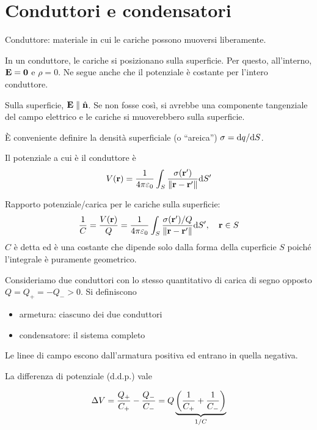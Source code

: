 
\section{Conduttori e condensatori}

Conduttore: materiale in cui le cariche possono muoversi liberamente.

In un conduttore, le cariche si posizionano sulla superficie.
Per questo, all'interno, $\mathbf{E} = \mathbf{0}$ e $\rho = 0$.
Ne segue anche che il potenziale è costante per l'intero conduttore.

Sulla superficie, $\mathbf{E} \parallel \hat{\mathbf{n}}$.
Se non fosse così, si avrebbe una componente tangenziale del campo elettrico e le cariche si muoverebbero sulla superficie.

È conveniente definire la densità superficiale (o ``areica'') $\sigma = \mathrm{d} q / \mathrm{d} S$.

Il potenziale a cui è il conduttore è
\begin{equation}
    V(\mathbf{r}) = \frac{1}{4\pi \varepsilon_0} \int_S \frac{\sigma(\mathbf{r}')}{\left\lVert \mathbf{r} - \mathbf{r}' \right\rVert} \mathrm{d} S'
\end{equation}

Rapporto potenziale/carica per le cariche sulla superficie:
\begin{equation}
    \frac{1}{C} = \frac{V(\mathbf{r})}{Q} = \frac{1}{4\pi \varepsilon_0} \int_S \frac{\sigma(\mathbf{r}')/Q}{\left\lVert \mathbf{r} - \mathbf{r}' \right\rVert} \mathrm{d} S', \quad \mathbf{r} \in S
\end{equation}
$C$ è detta  ed è una costante che dipende solo dalla forma della cuperficie $S$ poiché l'integrale è puramente geometrico.

Consideriamo due conduttori con lo stesso quantitativo di carica di segno opposto $Q = Q_+ = -Q_- > 0$.
Si definiscono
\begin{itemize}
    \item armetura: ciascuno dei due conduttori
    \item condensatore: il sistema completo
\end{itemize}

Le linee di campo escono dall'armatura positiva ed entrano in quella negativa.

La differenza di potenziale (d.d.p.) vale

\begin{equation}
    \Delta V = \frac{Q_+}{C_+} - \frac{Q_-}{C_-} = Q \underbrace{\left( \frac{1}{C_+} + \frac{1}{C_-} \right)}_{1/C}
\end{equation}

